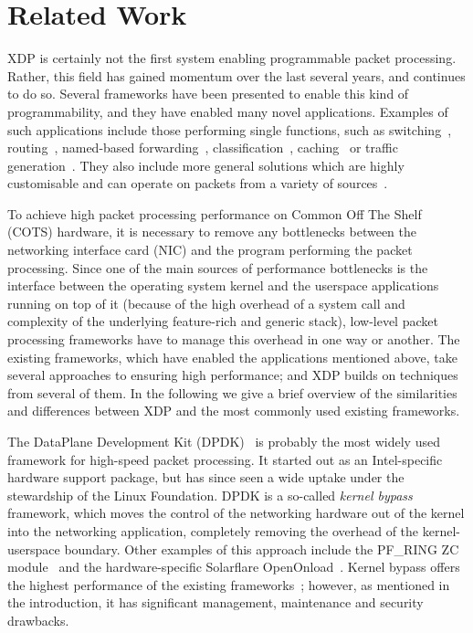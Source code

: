 \documentclass[sigconf]{acmart}
\begin{document}
\section{Related Work}%
\label{sec:related-work}

XDP is certainly not the first system enabling programmable packet processing.
Rather, this field has gained momentum over the last several years, and
continues to do so. Several frameworks have been presented to enable this kind
of programmability, and they have enabled many novel applications. Examples of
such applications include those performing single functions, such as
switching~\cite{rizzo2012vale}, routing~\cite{han2010packetshader}, named-based
forwarding~\cite{kirchner2016augustus}, classification~\cite{santiago2012wire},
caching~\cite{mansilha2015hierarchical} or traffic
generation~\cite{emmerich2015moongen}. They also include more general solutions
which are highly customisable and can operate on packets from a variety of
sources~\cite{han2012megapipe,marian2012netslices,linguaglossa2017high,morris1999click,dobrescu2009routebricks,openvswitch}.

To achieve high packet processing performance on Common Off The Shelf (COTS)
hardware, it is necessary to remove any bottlenecks between the networking
interface card (NIC) and the program performing the packet processing. Since one
of the main sources of performance bottlenecks is the interface between the
operating system kernel and the userspace applications running on top of it
(because of the high overhead of a system call and complexity of the underlying
feature-rich and generic stack), low-level packet processing frameworks have to
manage this overhead in one way or another. The existing frameworks, which have
enabled the applications mentioned above, take several approaches to ensuring
high performance; and XDP builds on techniques from several of them. In the
following we give a brief overview of the similarities and differences between
XDP and the most commonly used existing frameworks.

The DataPlane Development Kit (DPDK)~\cite{dpdk} is probably the most widely
used framework for high-speed packet processing. It started out as an
Intel-specific hardware support package, but has since seen a wide uptake under
the stewardship of the Linux Foundation. DPDK is a so-called \emph{kernel
  bypass} framework, which moves the control of the networking hardware out of
the kernel into the networking application, completely removing the overhead of
the kernel-userspace boundary. Other examples of this approach include the
PF\_RING ZC module~\cite{pfringzc} and the hardware-specific Solarflare
OpenOnload~\cite{openonload}. Kernel bypass offers the highest performance of
the existing frameworks~\cite{gallenmuller_comparison_2015}; however, as
mentioned in the introduction, it has significant management, maintenance and
security drawbacks.
\end{document}
